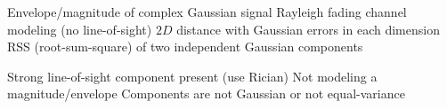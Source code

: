 
\PSyes{} Envelope/magnitude of complex Gaussian signal\PSbr{}\PSyes{} Rayleigh fading channel modeling (no line-of-sight)\PSbr{}\PSyes{} $2D$ distance with Gaussian errors in each dimension\PSbr{}\PSyes{} RSS (root-sum-square) of two independent Gaussian components


\PSno{} Strong line-of-sight component present (use Rician)\PSbr{}\PSno{} Not modeling a magnitude/envelope\PSbr{}\PSno{} Components are not Gaussian or not equal-variance



\begin{Shaded}
\begin{Highlighting}[]
 \OperatorTok{=} \OperatorTok{;}   
 \OperatorTok{=} \NormalTok{(}\OperatorTok{,} \OperatorTok{,} \NormalTok{)}\OperatorTok{;}

 \OperatorTok{=} \NormalTok{(}\OperatorTok{,} \NormalTok{)}\OperatorTok{;}
 \OperatorTok{=} \NormalTok{(}\OperatorTok{,} \NormalTok{)}\OperatorTok{;}

\OperatorTok{;}
\NormalTok{(}\OperatorTok{,}\OperatorTok{,}\NormalTok{)}\OperatorTok{;}
\NormalTok{(}\OperatorTok{,} \OperatorTok{,} \OperatorTok{,} \OperatorTok{,} \NormalTok{)}\OperatorTok{;}
\NormalTok{(}\NormalTok{)}\OperatorTok{;} \NormalTok{(}\NormalTok{)}\OperatorTok{;}
\NormalTok{(}\NormalTok{(}\OperatorTok{,} \NormalTok{))}\OperatorTok{;}
 \OperatorTok{;}


\end{Highlighting}
\end{Shaded}
